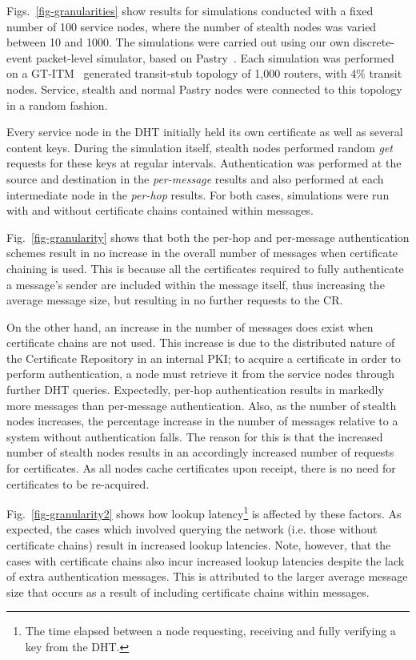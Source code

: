 \documentclass[times, 10pt,twocolumn]{article}
\begin{document}
Figs.~\ref{fig-granularities} show results for simulations conducted
with a fixed number of 100 service nodes, where the number of stealth
nodes was varied between 10 and 1000. The simulations were carried out
using our own discrete-event packet-level simulator, based on
Pastry~\cite{Rowstron01Pastry}. Each simulation was performed on a
GT-ITM~\cite{Calvert97Modeling} generated transit-stub topology of
1,000 routers, with 4\% transit nodes. Service, stealth and normal
Pastry nodes were connected to this topology in a random fashion.

Every service node in the DHT initially held its own certificate as
well as several content keys. During the simulation itself, stealth
nodes performed random \emph{get} requests for these keys at regular
intervals. Authentication was performed at the source and destination
in the \emph{per-message} results and also performed at each
intermediate node in the \emph{per-hop} results. For both cases,
simulations were run with and without certificate chains contained
within messages.

Fig.~\ref{fig-granularity} shows that both the per-hop and per-message
authentication schemes result in no increase in the overall number of
messages when certificate chaining is used. This is because all the
certificates required to fully authenticate a message's sender are
included within the message itself, thus increasing the average message
size, but resulting in no further requests to the CR.

On the other hand, an increase in the number of messages does exist
when certificate chains are not used. This increase is due to the
distributed nature of the Certificate Repository in an internal PKI; to
acquire a certificate in order to perform authentication, a node must
retrieve it from the service nodes through further DHT queries.
Expectedly, per-hop authentication results in markedly more messages
than per-message authentication. Also, as the number of stealth nodes
increases, the percentage increase in the number of messages relative
to a system without authentication falls. The reason for this is that
the increased number of stealth nodes results in an accordingly
increased number of requests for certificates. As all nodes cache
certificates upon receipt, there is no need for certificates to be
re-acquired.

Fig.~\ref{fig-granularity2} shows how lookup latency\footnote{The time
elapsed between a node requesting, receiving and fully verifying a key
from the DHT.} is affected by these factors. As expected, the cases
which involved querying the network (i.e. those without certificate
chains) result in increased lookup latencies. Note, however, that the
cases with certificate chains also incur increased lookup latencies
despite the lack of extra authentication messages. This is attributed
to the larger average message size that occurs as a result of including
certificate chains within messages.
\end{document}
